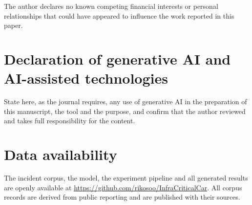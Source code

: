 \documentclass[preprint,12pt]{elsarticle}
\begin{document}
The author declares no known competing financial interests or personal
relationships that could have appeared to influence the work reported in this
paper.

\section*{Declaration of generative AI and AI-assisted technologies}

State here, as the journal requires, any use of generative AI in the preparation
of this manuscript, the tool and the purpose, and confirm that the author
reviewed and takes full responsibility for the content.

\section*{Data availability}

The incident corpus, the model, the experiment pipeline and all generated
results are openly available at \url{https://github.com/rikosoo/InfraCriticalCar}.
All corpus records are derived from public reporting and are published with
their sources.



\end{document}
